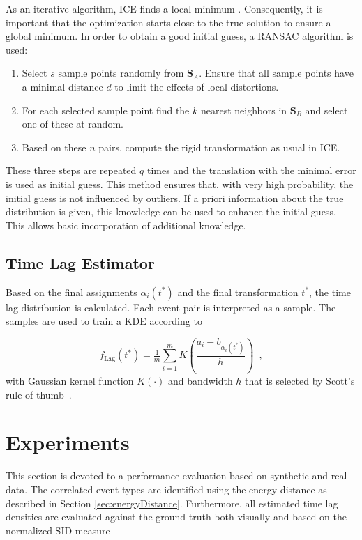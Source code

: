 \documentclass[conference]{IEEEtran}
\theoremstyle{examplestyle}
\begin{document}
As an iterative algorithm, \ac{ICE} finds a local minimum \cite{Do2008}. Consequently, it is important that the optimization starts close to the true solution to ensure a global minimum. In order to obtain a good initial guess, a \ac{RANSAC} \cite{Fischler1981} algorithm is used:
\begin{enumerate}
	\item Select \(s\) sample points randomly from \(\pmb{S}_A\). Ensure that all sample points have a minimal distance \(d\) to limit the effects of local distortions.
	\item For each selected sample point find the \(k\) nearest neighbors in \(\pmb{S}_B\) and select one of these at random.
	\item Based on these \(n\) pairs, compute the rigid transformation as usual in \ac{ICE}.
\end{enumerate}

These three steps are repeated \(q\) times and the translation with the minimal error is used as initial guess. This method ensures that, with very high probability, the initial guess is not influenced by outliers. If a priori information about the true distribution is given, this knowledge can be used to enhance the initial guess. This allows basic incorporation of additional knowledge.


\subsection{Time Lag Estimator} \label{sec:labestimator}
Based on the final assignments $\alpha_i(t^*)$ and the final transformation $t^*$, the time lag distribution is calculated. Each event pair is interpreted as a sample. The samples are used to train a \ac{KDE} according to

\begin{equation}
	\label{eq:solutionICP}
 f_{\text{Lag}}(t^*) = \tfrac{1}{m} \sum_{i=1}^m K\left( \frac{a_i - b_{\alpha_i(t^*)}}{ h} \right) \enspace ,
	\end{equation}
with Gaussian kernel function $K(\cdot)$ and bandwidth $h$ that is selected by Scott's rule-of-thumb~\cite{Scott1992}.











\section{Experiments} \label{sec:exp}
This section is devoted to a performance evaluation based on synthetic and real data.
The correlated event types are identified using the energy distance as described in Section \ref{sec:energyDistance}.
Furthermore, all estimated time lag densities are evaluated against the ground truth both visually and based on the normalized \ac{SID} measure \cite{Hanebeck2003}
\end{document}
